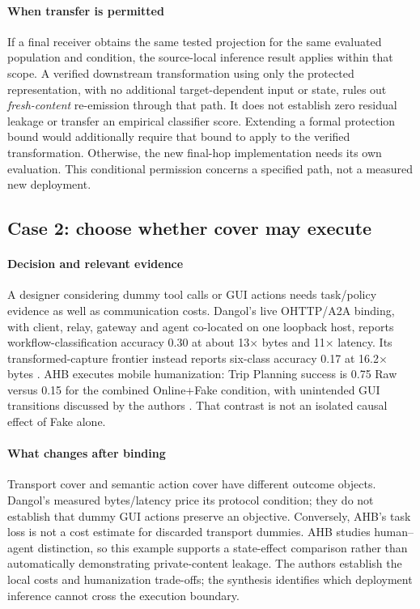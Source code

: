 \paragraph{When transfer is permitted}
If a final receiver obtains the same tested projection for the same evaluated population and condition, the source-local inference result applies within that scope. A verified downstream transformation using only the protected representation, with no additional target-dependent input or state, rules out \emph{fresh-content} re-emission through that path. It does not establish zero residual leakage or transfer an empirical classifier score. Extending a formal protection bound would additionally require that bound to apply to the verified transformation. Otherwise, the new final-hop implementation needs its own evaluation. This conditional permission concerns a specified path, not a measured new deployment.

\subsection{Case 2: choose whether cover may execute}
\paragraph{Decision and relevant evidence}
A designer considering dummy tool calls or GUI actions needs task/policy evidence as well as communication costs. Dangol's live OHTTP/A2A binding, with client, relay, gateway and agent co-located on one loopback host, reports workflow-classification accuracy 0.30 at about 13$\times$ bytes and 11$\times$ latency. Its transformed-capture frontier instead reports six-class accuracy 0.17 at 16.2$\times$ bytes \cite{dangol2026workflow}. AHB executes mobile humanization: Trip Planning success is 0.75 Raw versus 0.15 for the combined Online+Fake condition, with unintended GUI transitions discussed by the authors \cite{zhu2026turing}. That contrast is not an isolated causal effect of Fake alone.

\paragraph{What changes after binding}
Transport cover and semantic action cover have different outcome objects. Dangol's measured bytes/latency price its protocol condition; they do not establish that dummy GUI actions preserve an objective. Conversely, AHB's task loss is not a cost estimate for discarded transport dummies. AHB studies human--agent distinction, so this example supports a state-effect comparison rather than automatically demonstrating private-content leakage. The authors establish the local costs and humanization trade-offs; the synthesis identifies which deployment inference cannot cross the execution boundary.

